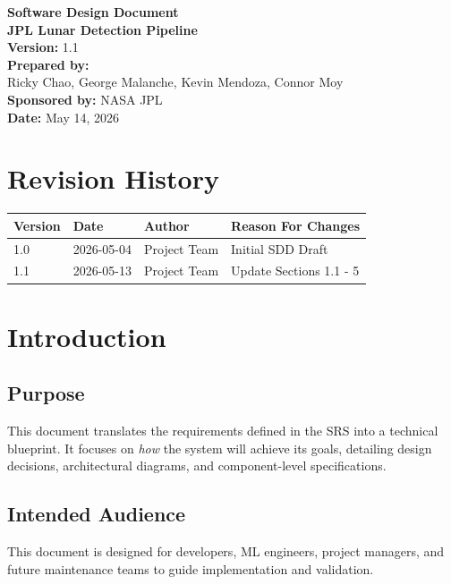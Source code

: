 \documentclass[12pt]{article}
\begin{document}
\begin{titlepage}
    \centering
    \vspace*{2cm}
    {\Huge \textbf{Software Design Document}} \\
    \vspace{0.5cm}
    {\Large \textbf{JPL Lunar Detection Pipeline}} \\
    \vfill
    \textbf{Version:} 1.1 \\
    \textbf{Prepared by:} \\
     Ricky Chao, George Malanche, Kevin Mendoza, Connor Moy \\
    \vspace{1cm}
    \textbf{Sponsored by:} NASA JPL \\
    \textbf{Date:} May 14, 2026
\end{titlepage}

\newpage
\tableofcontents
\newpage

\section*{Revision History}
\begin{tabularx}{\textwidth}{|l|l|l|X|}
\hline
\textbf{Version} & \textbf{Date} & \textbf{Author} & \textbf{Reason For Changes} \\ \hline
1.0 & 2026-05-04 & Project Team & Initial SDD Draft \\ \hline
1.1 & 2026-05-13 & Project Team & Update Sections 1.1 - 5 \\ \hline\hline
\end{tabularx}


\section{Introduction}
\subsection{Purpose}
This document translates the requirements defined in the SRS into a technical blueprint. It focuses on \textit{how} the system will achieve its goals, detailing design decisions, architectural diagrams, and component-level specifications.

\subsection{Intended Audience}
This document is designed for developers, ML engineers, project managers, and future maintenance teams to guide implementation and validation.
\end{document}

